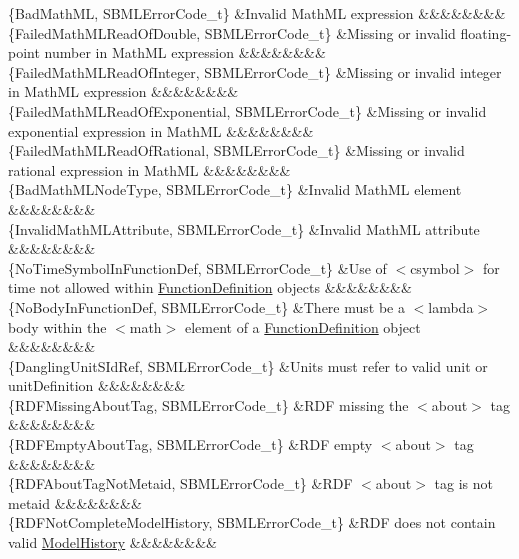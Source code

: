 \begin{DoxyParagraph}{}
\begin{longtabu}
\{Bad\+Math\+ML, S\+B\+M\+L\+Error\+Code\+\_\+t\} &Invalid Math\+ML expression &&&&&&&&\\
\{Failed\+Math\+M\+L\+Read\+Of\+Double, S\+B\+M\+L\+Error\+Code\+\_\+t\} &Missing or invalid floating-\/point number in Math\+ML expression &&&&&&&&\\
\{Failed\+Math\+M\+L\+Read\+Of\+Integer, S\+B\+M\+L\+Error\+Code\+\_\+t\} &Missing or invalid integer in Math\+ML expression &&&&&&&&\\
\{Failed\+Math\+M\+L\+Read\+Of\+Exponential, S\+B\+M\+L\+Error\+Code\+\_\+t\} &Missing or invalid exponential expression in Math\+ML &&&&&&&&\\
\{Failed\+Math\+M\+L\+Read\+Of\+Rational, S\+B\+M\+L\+Error\+Code\+\_\+t\} &Missing or invalid rational expression in Math\+ML &&&&&&&&\\
\{Bad\+Math\+M\+L\+Node\+Type, S\+B\+M\+L\+Error\+Code\+\_\+t\} &Invalid Math\+ML element &&&&&&&&\\
\{Invalid\+Math\+M\+L\+Attribute, S\+B\+M\+L\+Error\+Code\+\_\+t\} &Invalid Math\+ML attribute &&&&&&&&\\
\{No\+Time\+Symbol\+In\+Function\+Def, S\+B\+M\+L\+Error\+Code\+\_\+t\} &Use of {\ttfamily $<$csymbol$>$} for \textquotesingle{}time\textquotesingle{} not allowed within \hyperlink{class_function_definition}{Function\+Definition} objects &&&&&&&&\\
\{No\+Body\+In\+Function\+Def, S\+B\+M\+L\+Error\+Code\+\_\+t\} &There must be a {\ttfamily $<$lambda$>$} body within the {\ttfamily $<$math$>$} element of a \hyperlink{class_function_definition}{Function\+Definition} object &&&&&&&&\\
\{Dangling\+Unit\+S\+Id\+Ref, S\+B\+M\+L\+Error\+Code\+\_\+t\} &Units must refer to valid unit or unit\+Definition &&&&&&&&\\
\{R\+D\+F\+Missing\+About\+Tag, S\+B\+M\+L\+Error\+Code\+\_\+t\} &R\+DF missing the {\ttfamily $<$about$>$} tag &&&&&&&&\\
\{R\+D\+F\+Empty\+About\+Tag, S\+B\+M\+L\+Error\+Code\+\_\+t\} &R\+DF empty {\ttfamily $<$about$>$} tag &&&&&&&&\\
\{R\+D\+F\+About\+Tag\+Not\+Metaid, S\+B\+M\+L\+Error\+Code\+\_\+t\} &R\+DF {\ttfamily $<$about$>$} tag is not metaid &&&&&&&&\\
\{R\+D\+F\+Not\+Complete\+Model\+History, S\+B\+M\+L\+Error\+Code\+\_\+t\} &R\+DF does not contain valid \hyperlink{class_model_history}{Model\+History} &&&&&&&&\\

\end{longtabu}
\end{DoxyParagraph}
